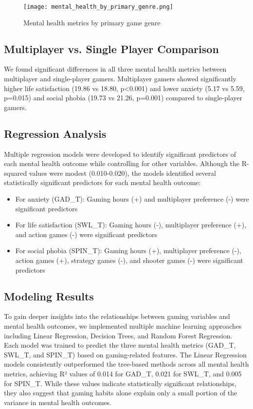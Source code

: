 \documentclass[12pt]{article}
\begin{document}
\begin{figure}[H]
\centering
\texttt{[image: mental\_health\_by\_primary\_genre.png]}
\caption{Mental health metrics by primary game genre}
\label{fig:game_genres}
\end{figure}

\subsection{Multiplayer vs. Single Player Comparison}

We found significant differences in all three mental health metrics between multiplayer and single-player gamers. Multiplayer gamers showed significantly higher life satisfaction (19.86 vs 18.80, p\textless0.001) and lower anxiety (5.17 vs 5.59, p=0.015) and social phobia (19.73 vs 21.26, p=0.001) compared to single-player gamers.

\subsection{Regression Analysis}

Multiple regression models were developed to identify significant predictors of each mental health outcome while controlling for other variables. Although the R-squared values were modest (0.010-0.020), the models identified several statistically significant predictors for each mental health outcome:

\begin{itemize}
    \item For anxiety (GAD\_T): Gaming hours (+) and multiplayer preference (-) were significant predictors
    \item For life satisfaction (SWL\_T): Gaming hours (-), multiplayer preference (+), and action games (-) were significant predictors
    \item For social phobia (SPIN\_T): Gaming hours (+), multiplayer preference (-), action games (+), strategy games (-), and shooter games (-) were significant predictors
\end{itemize}

\subsection{Modeling Results}

To gain deeper insights into the relationships between gaming variables and mental health outcomes, we implemented multiple machine learning approaches including Linear Regression, Decision Trees, and Random Forest Regression. Each model was trained to predict the three mental health metrics (GAD\_T, SWL\_T, and SPIN\_T) based on gaming-related features. The Linear Regression models consistently outperformed the tree-based methods across all mental health metrics, achieving R² values of 0.014 for GAD\_T, 0.021 for SWL\_T, and 0.005 for SPIN\_T. While these values indicate statistically significant relationships, they also suggest that gaming habits alone explain only a small portion of the variance in mental health outcomes.
\end{document}

